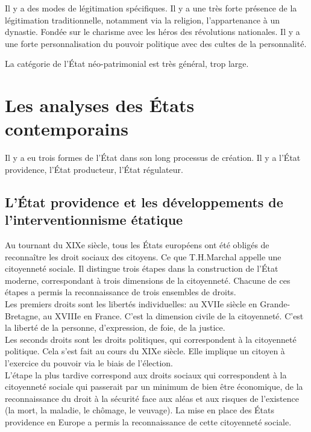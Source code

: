 \documentclass[10pt, a4paper, openany]{book}
\begin{document}
Il y a des modes de légitimation spécifiques. Il y a une très forte présence de la légitimation traditionnelle, notamment via la religion, l'appartenance à un dynastie. Fondée sur le charisme avec les héros des révolutions nationales. Il y a une forte personnalisation du pouvoir politique avec des cultes de la personnalité. 


La catégorie de l'État néo-patrimonial est très général, trop large. 


\chapter{Les analyses des États contemporains}

Il y a eu trois formes de l'État dans son long processus de création. Il y a l'État providence, l'État producteur, l'État régulateur. 

\section{L'État providence et les développements de l'interventionnisme étatique}

Au tournant du XIXe siècle, tous les États européens ont été obligés de reconnaître les droit sociaux des citoyens. Ce que T.H.Marchal appelle une citoyenneté sociale. Il distingue trois étapes dans la construction de l'État moderne, correspondant à trois dimensions de la citoyenneté. Chacune de ces étapes a permis la reconnaissance de trois ensembles de droits. \\
Les premiers droits sont les libertés individuelles: au XVIIe siècle en Grande-Bretagne, au XVIIIe en France. C'est la dimension civile de la citoyenneté. C'est la liberté de la personne, d'expression, de foie, de la justice. \\
Les seconds droits sont les droits politiques, qui correspondent à la citoyenneté politique. Cela s'est fait au cours du XIXe siècle. Elle implique un citoyen à l'exercice du pouvoir via le biais de l'élection. \\
L'étape la plus tardive correspond aux droits sociaux qui correspondent à la citoyenneté sociale qui passerait par un minimum de bien être économique, de la reconnaissance du droit à la sécurité face aux aléas et aux risques de l'existence (la mort, la maladie, le chômage, le veuvage). La mise en place des États providence en Europe a permis la reconnaissance de cette citoyenneté sociale. 
\end{document}
